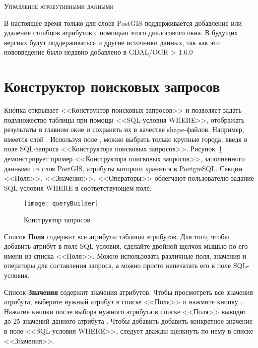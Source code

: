 \begin{Tip}\caption{\textsc{Управление атрибутивными данными}}
В настоящее время только для слоев PostGIS поддерживается добавление или
удаление столбцов атрибутов с помощью этого диалогового окна. В
будущих версиях \qg будут поддерживаться и другие источники данных,
так как это нововведение было недавно добавлено в GDAL/OGR > 1.6.0
\end{Tip}

\section{Конструктор поисковых запросов}\label{sec:query_builder}

Кнопка  открывает <<Конструктор поисковых
запросов>> и позволяет задать подмножество таблицы при помощи
<<SQL-условия WHERE>>, отображать результаты в главном окне и сохранять
их в качестве shape-файлов. Например, имеется слой .
Используя поле , можно выбрать только крупные города,
введя  в поле SQL-запроса <<Конструктора
поисковых запросов>>. Рисунок~\ref{fig:query_builder} демонстрирует пример
<<Конструктора поисковых запросов>>, заполненного данными из слоя PostGIS,
атрибуты которого хранятся в PostgreSQL. Секции <<Поля>>, <<Значения>>,
<<Операторы>> облегчают пользователю задание SQL-условия WHERE в
соответствующем поле.

\begin{figure}[ht]
  \centering
    \texttt{[image: queryBuilder]}
    \caption{Конструктор запросов \wincaption}\label{fig:query_builder}
\end{figure}

Список \textbf{Поля} содержит все атрибуты таблицы атрибутов. Для того,
чтобы добавить атрибут в поле SQL-условия, сделайте двойной щелчок мышью
по его имени из списка <<Поля>>. Можно использовать различные поля, значения
и операторы для составления запроса, а можно просто напечатать его в поле
SQL-условия.

Список \textbf{Значения} содержит значения атрибутов. Чтобы просмотреть все
значения атрибута, выберите нужный атрибут в списке <<Поля>> и нажмите кнопку
 . Нажатие кнопки
 после выбора нужного атрибута в списке <<Поля>> выводит
до 25 значений данного атрибута .
Чтобы добавить добавить конкретное значение в поле <<SQL-условия WHERE>>,
следует дважды щёлкнуть по нему в списке <<Значения>>.

